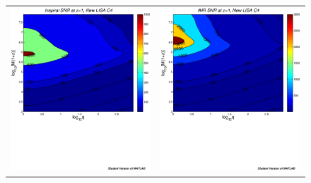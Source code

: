 \documentclass{iopart}
\begin{document}
\begin{figure}[H]
\begin{center}
\begin{tabular}{cc}
\includegraphics[scale=0.41,clip=true]{FigEmanuele/C4InspSNRContourz1.ps}
&\includegraphics[scale=0.41,clip=true]{FigEmanuele/C4IMRSNRContourz1.ps}\\

\end{tabular}
\end{center}
\end{figure}
\end{document}
